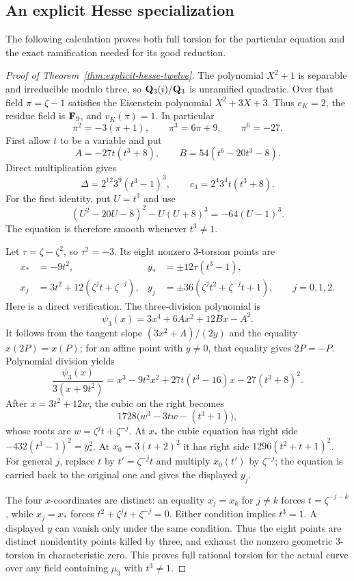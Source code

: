 \subsection{An explicit Hesse specialization}
The following calculation proves both full torsion for the particular equation and the exact ramification needed for its good reduction.

\begin{proof}[Proof of Theorem~\ref{thm:explicit-hesse-twelve}]
The polynomial $X^2+1$ is separable and irreducible modulo three, so $\mathbf Q_3(i)/\mathbf Q_3$ is unramified quadratic. Over that field $\pi=\zeta-1$ satisfies the Eisenstein polynomial $X^2+3X+3$. Thus $e_K=2$, the residue field is $\mathbf F_9$, and $v_K(\pi)=1$. In particular
\[
 \pi^2=-3(\pi+1),\qquad \pi^3=6\pi+9,\qquad \pi^6=-27.
\]
First allow $t$ to be a variable and put
\[
 A=-27t(t^3+8),\qquad B=54(t^6-20t^3-8).
\]
Direct multiplication gives
\begin{equation}\label{eq:hesse-invariants}
 \Delta=2^{12}3^9(t^3-1)^3,\qquad c_4=2^4 3^4t(t^3+8).
\end{equation}
For the first identity, put $U=t^3$ and use
\[
 (U^2-20U-8)^2-U(U+8)^3=-64(U-1)^3.
\]
The equation is therefore smooth whenever $t^3\ne1$.

Let $\tau=\zeta-\zeta^2$, so $\tau^2=-3$. Its eight nonzero $3$-torsion points are
\begin{align*}
 x_*&=-9t^2,& y_*&=\pm12\tau(t^3-1),\\
 x_j&=3t^2+12(\zeta^jt+\zeta^{-j}),&
 y_j&=\pm36(\zeta^jt^2+\zeta^{-j}t+1),\qquad j=0,1,2.
\end{align*}
Here is a direct verification. The three-division polynomial is
\[
 \psi_3(x)=3x^4+6Ax^2+12Bx-A^2.
\]
It follows from the tangent slope $(3x^2+A)/(2y)$ and the equality $x(2P)=x(P)$; for an affine point with $y\ne0$, that equality gives $2P=-P$. Polynomial division yields
\[
 \frac{\psi_3(x)}{3(x+9t^2)}
 =x^3-9t^2x^2+27t(t^3-16)x-27(t^3+8)^2.
\]
After $x=3t^2+12w$, the cubic on the right becomes
\[
 1728\bigl(w^3-3tw-(t^3+1)\bigr),
\]
whose roots are $w=\zeta^jt+\zeta^{-j}$. At $x_*$ the cubic equation has right side $-432(t^3-1)^2=y_*^2$. At $x_0=3(t+2)^2$ it has right side $1296(t^2+t+1)^2$. For general $j$, replace $t$ by $t'=\zeta^{-j}t$ and multiply $x_0(t')$ by $\zeta^{-j}$; the equation is carried back to the original one and gives the displayed $y_j$.

The four $x$-coordinates are distinct: an equality $x_j=x_k$ for $j\ne k$ forces $t=\zeta^{-j-k}$, while $x_j=x_*$ forces $t^2+\zeta^jt+\zeta^{-j}=0$. Either condition implies $t^3=1$. A displayed $y$ can vanish only under the same condition. Thus the eight points are distinct nonidentity points killed by three, and exhaust the nonzero geometric $3$-torsion in characteristic zero. This proves full rational torsion for the actual curve over any field containing $\mu_3$ with $t^3\ne1$.


\end{proof}

